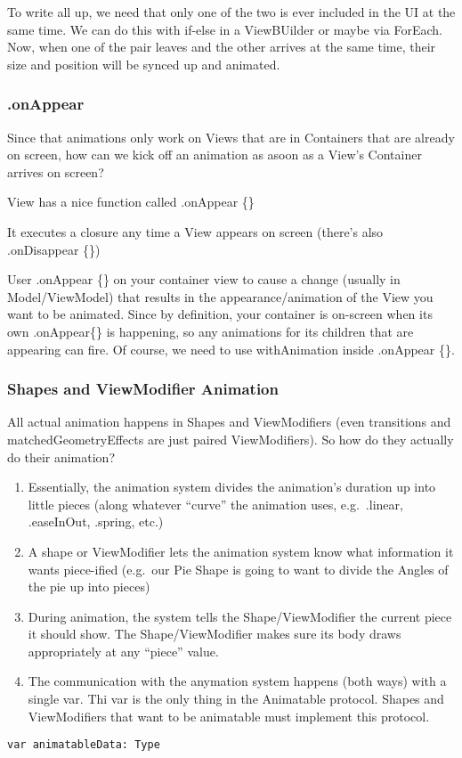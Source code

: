 \documentclass[]{article}
\providecommand{\tightlist}{%
  \setlength{\itemsep}{0pt}\setlength{\parskip}{0pt}}
\begin{document}
To write all up, we need that only one of the two is ever included in
the UI at the same time. We can do this with if-else in a ViewBUilder or
maybe via ForEach. Now, when one of the pair leaves and the other
arrives at the same time, their size and position will be synced up and
animated.

\hypertarget{onappear}{%
\subsubsection{.onAppear}\label{onappear}}

Since that animations only work on Views that are in Containers that are
already on screen, how can we kick off an animation as asoon as a View's
Container arrives on screen?

View has a nice function called .onAppear \{\}

It executes a closure any time a View appears on screen (there's also
.onDisappear \{\})

User .onAppear \{\} on your container view to cause a change (usually in
Model/ViewModel) that results in the appearance/animation of the View
you want to be animated. Since by definition, your container is
on-screen when its own .onAppear\{\} is happening, so any animations for
its children that are appearing can fire. Of course, we need to use
withAnimation inside .onAppear \{\}.

\hypertarget{shapes-and-viewmodifier-animation}{%
\subsubsection{Shapes and ViewModifier
Animation}\label{shapes-and-viewmodifier-animation}}

All actual animation happens in Shapes and ViewModifiers (even
transitions and matchedGeometryEffects are just paired ViewModifiers).
So how do they actually do their animation?

\begin{enumerate}
\def\labelenumi{\arabic{enumi}.}
\tightlist
\item
  Essentially, the animation system divides the animation's duration up
  into little pieces (along whatever ``curve'' the animation uses,
  e.g.~.linear, .easeInOut, .spring, etc.)
\item
  A shape or ViewModifier lets the animation system know what
  information it wants piece-ified (e.g.~our Pie Shape is going to want
  to divide the Angles of the pie up into pieces)
\item
  During animation, the system tells the Shape/ViewModifier the current
  piece it should show. The Shape/ViewModifier makes sure its body draws
  appropriately at any ``piece'' value.
\item
  The communication with the anymation system happens (both ways) with a
  single var. Thi var is the only thing in the Animatable protocol.
  Shapes and ViewModifiers that want to be animatable must implement
  this protocol.
\end{enumerate}

\begin{verbatim}
var animatableData: Type
\end{verbatim}
\end{document}
